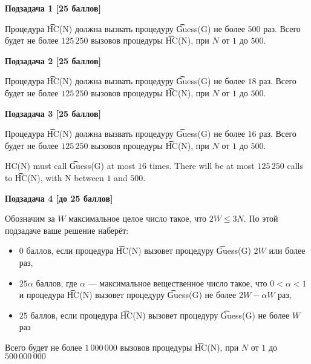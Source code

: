 {\bf Подзадача 1 [25 баллов]}

Процедура \t{HC(N)} должна вызвать процедуру \t{Guess(G)} не более $500$ раз. Всего будет не более $125\,250$ вызовов процедуры \t{HC(N)}, при $N$ от $1$ до $500$.

{\bf Подзадача 2 [25 баллов]}

Процедура \t{HC(N)} должна вызвать процедуру \t{Guess(G)} не более $18$ раз. Всего будет не более $125\,250$ вызовов процедуры \t{HC(N)}, при $N$ от $1$ до $500$.

{\bf Подзадача 3 [25 баллов]}

Процедура \t{HC(N)} должна вызвать процедуру \t{Guess(G)} не более $16$ раз. Всего будет не более $125\,250$ вызовов процедуры \t{HC(N)}, при $N$ от $1$ до $500$.

HC(N) must call \t{Guess(G)} at most $16$ times. There will be at most $125\,250$ calls to \t{HC(N)}, with N between $1$ and $500$.

{\bf Подзадача 4 [до 25 баллов]}

Обозначим за $W$ максимальное целое число такое, что $2 W \le 3 N$. По этой подзадаче ваше решение наберёт:

\begin{itemize}
\item $0$ баллов, если процедура \t{HC(N)} вызовет процедуру \t{Guess(G)} $2W$ или более раз, 
\item $25\alpha$ баллов, где $\alpha$ --- максимальное вещественное число такое, что $0 < \alpha < 1$ и процедура \t{HC(N)} вызовет процедуру \t{Guess(G)} не более $2W - \alpha W$ раз, 
\item $25$ баллов, если процедура \t{HC(N)} вызовет процедуру \t{Guess(G)} не более $W$ раз
\end{itemize}

Всего будет не более $1\,000\,000$ вызовов процедуры \t{HC(N)}, при $N$ от $1$ до $500\,000\,000$
